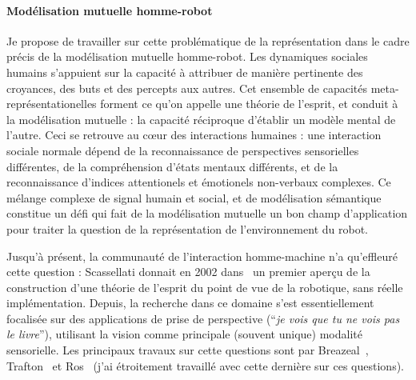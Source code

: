 \documentclass[a4paper]{article}
\begin{document}
\paragraph{Modélisation mutuelle homme-robot}

Je propose de travailler sur cette problématique de la représentation dans le cadre
précis de la modélisation mutuelle homme-robot. Les dynamiques sociales humains
s'appuient sur la capacité à attribuer de manière pertinente des croyances, des
buts et des percepts aux autres. Cet ensemble de capacités
meta-représentationelles forment ce qu'on appelle une théorie de l'esprit, et
conduit à la modélisation mutuelle : la capacité réciproque d'établir un modèle
mental de l'autre. Ceci se retrouve au c\oe ur des interactions humaines : une
interaction sociale normale dépend de la reconnaissance de perspectives
sensorielles différentes, de la compréhension d'états mentaux différents, et de
la reconnaissance d'indices attentionels et émotionels non-verbaux complexes.
Ce mélange complexe de signal humain et social, et de modélisation sémantique
constitue un défi qui fait de la modélisation mutuelle un bon champ
d'application pour traiter la question de la représentation de l'environnement
du robot.

Jusqu'à présent, la communauté de l'interaction homme-machine n'a qu'effleuré
cette question : Scassellati donnait en 2002 dans~\cite{scassellati2002theory}
un premier aperçu de la construction d'une théorie de l'esprit du point de vue
de la robotique, sans réelle implémentation. Depuis, la recherche dans ce
domaine s'est essentiellement focalisée sur des applications de prise de
perspective (``\emph{je vois que tu ne vois pas le livre}''), utilisant la
vision comme principale (souvent unique) modalité sensorielle. Les principaux
travaux sur cette questions sont par Breazeal~\cite{breazeal2006using},
Trafton~\cite{Trafton2005} et Ros~\cite{Ros2010} (j'ai étroitement travaillé
avec cette dernière sur ces questions).
\end{document}
